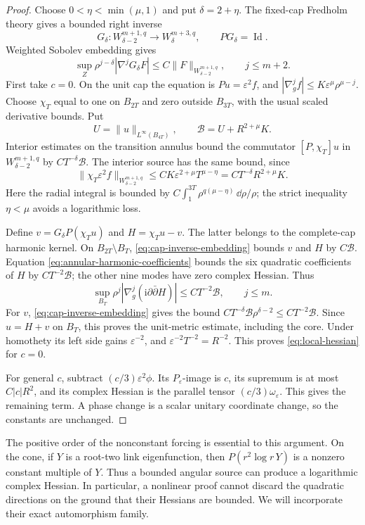 \begin{proof}
Choose $0<\eta<\min(\mu,1)$ and put $\delta=2+\eta$.
The fixed-cap Fredholm theory gives a bounded right inverse
\[
 G_\delta:W^{m+1,q}_{\delta-2}\longrightarrow
                    W^{m+3,q}_\delta,\qquad PG_\delta=\operatorname{Id}.
\]
Weighted Sobolev embedding gives
\begin{equation}\label{eq:cap-inverse-embedding}
 \sup_Z\rho^{j-\delta}|\nabla^jG_\delta F|
       \le C\|F\|_{W^{m+1,q}_{\delta-2}},\qquad j\le m+2.
\end{equation}
First take $c=0$. On the unit cap the equation is $Pu=\varepsilon^2f$,
and $|\nabla_g^jf|\le K\varepsilon^\mu\rho^{\mu-j}$.
Choose $\chi_T$ equal to one on $B_{2T}$ and zero outside $B_{3T}$,
with the usual scaled derivative bounds. Put
\[
 U=\|u\|_{L^\infty(B_{4T})},\qquad
 \mathcal B=U+R^{2+\mu}K.
\]
Interior estimates on the transition annulus bound the commutator
$[P,\chi_T]u$ in $W^{m+1,q}_{\delta-2}$ by $CT^{-\delta}\mathcal B$.
The interior source has the same bound, since
\[
 \|\chi_T\varepsilon^2f\|_{W^{m+1,q}_{\delta-2}}
   \le CK\varepsilon^{2+\mu}T^{\mu-\eta}
   =CT^{-\delta}R^{2+\mu}K.
\]
Here the radial integral is bounded by
$C\int_1^{3T}\rho^{q(\mu-\eta)}\,\dd\rho/\rho$;
the strict inequality $\eta<\mu$ avoids a logarithmic loss.

Define $v=G_\delta P(\chi_Tu)$ and $H=\chi_Tu-v$. The latter
belongs to the complete-cap harmonic kernel. On
$B_{2T}\setminus B_T$, \eqref{eq:cap-inverse-embedding} bounds
$v$ and $H$ by $C\mathcal B$. Equation
\eqref{eq:annular-harmonic-coefficients} bounds the six quadratic
coefficients of $H$ by $CT^{-2}\mathcal B$; the other nine modes
have zero complex Hessian. Thus
\[
 \sup_{B_T}\rho^j|\nabla_g^j(\mathrm i\partial\bar\partial H)|
       \le CT^{-2}\mathcal B,\qquad j\le m.
\]
For $v$, \eqref{eq:cap-inverse-embedding} gives the bound
$CT^{-\delta}\mathcal B\rho^{\delta-2}
\le CT^{-2}\mathcal B$. Since $u=H+v$ on $B_T$, this proves
the unit-metric estimate, including the core.
Under homothety its left side gains $\varepsilon^{-2}$, and
$\varepsilon^{-2}T^{-2}=R^{-2}$. This proves
\eqref{eq:local-hessian} for $c=0$.

For general $c$, subtract $(c/3)\varepsilon^2\phi$. Its
$P_\varepsilon$-image is $c$, its supremum is at most
$C|c|R^2$, and its complex Hessian is the parallel tensor
$(c/3)\omega_\varepsilon$. This gives the remaining term.
A phase change is a scalar unitary coordinate change, so the
constants are unchanged.
\end{proof}

The positive order of the nonconstant forcing is essential to this
argument. On the cone, if $Y$ is a root-two link eigenfunction, then
$P(r^2\log r\,Y)$ is a nonzero constant multiple of $Y$. Thus a
bounded angular source can produce a logarithmic complex Hessian.
In particular, a nonlinear proof cannot discard the quadratic
directions on the ground that their Hessians are bounded. We will
incorporate their exact automorphism family.
